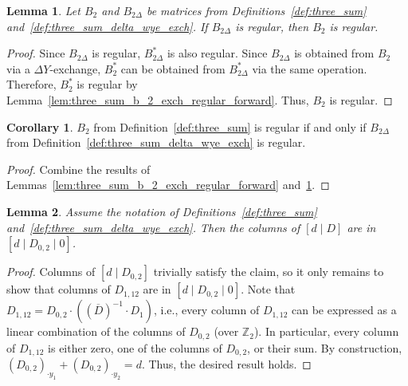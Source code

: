 \documentclass{article}
\newtheorem{lemma}{Lemma}
\theoremstyle{definition}
\newtheorem{corollary}{Corollary}
\begin{document}
\begin{lemma}\label{lem:three_sum_b_2_exch_regular_backward}
    Let $B_{2}$ and $B_{2 \Delta}$ be matrices from Definitions~\ref{def:three_sum} and~\ref{def:three_sum_delta_wye_exch}. If $B_{2 \Delta}$ is regular, then $B_{2}$ is regular. %
\end{lemma}

\begin{proof}
    Since $B_{2 \Delta}$ is regular, $B_{2 \Delta}^{*}$ is also regular. Since $B_{2 \Delta}$ is obtained from $B_{2}$ via a $\Delta Y$-exchange, $B_{2}^{*}$ can be obtained from $B_{2 \Delta}^{*}$ via the same operation. Therefore, $B_{2}^{*}$ is regular by Lemma~\ref{lem:three_sum_b_2_exch_regular_forward}. Thus, $B_{2}$ is regular.
\end{proof}

\begin{corollary}
    $B_{2}$ from Definition~\ref{def:three_sum} is regular if and only if $B_{2 \Delta}$ from Definition~\ref{def:three_sum_delta_wye_exch} is regular.
\end{corollary}

\begin{proof}
    Combine the results of Lemmas~\ref{lem:three_sum_b_2_exch_regular_forward} and~\ref{lem:three_sum_b_2_exch_regular_backward}.
\end{proof}

\begin{lemma}\label{lem:three_sum_columns_of_d_D}
    Assume the notation of Definitions~\ref{def:three_sum} and~\ref{def:three_sum_delta_wye_exch}. Then the columns of $[d \mid D]$ are in $[d \mid D_{0, 2} \mid 0]$.
\end{lemma}

\begin{proof}
    Columns of $[d \mid D_{0, 2}]$ trivially satisfy the claim, so it only remains to show that columns of $D_{1, 12}$ are in $[d \mid D_{0, 2} \mid 0]$. Note that $D_{1, 12} = D_{0, 2} \cdot ((\overline{D})^{-1} \cdot D_{1})$, i.e., every column of $D_{1, 12}$ can be expressed as a linear combination of the columns of $D_{0, 2}$ (over $\mathbb{Z}_{2}$). In particular, every column of $D_{1, 12}$ is either zero, one of the columns of $D_{0, 2}$, or their sum. By construction, $(D_{0, 2})_{\cdot y_{1}} + (D_{0, 2})_{\cdot y_{2}} = d$. Thus, the desired result holds.
\end{proof}
\end{document}
